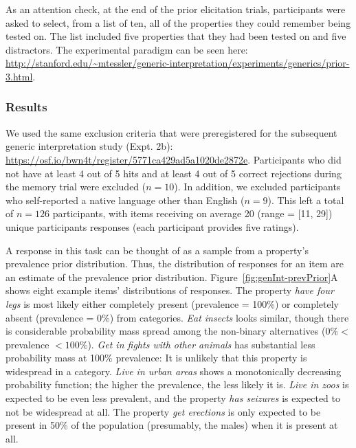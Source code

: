 \documentclass[floatsintext,doc]{apa6}
\theoremstyle{definition}
\theoremstyle{definition}
\theoremstyle{definition}
\theoremstyle{remark}
\begin{document}

As an attention check, at the end of the prior elicitation trials,
participants were asked to select, from a list of ten, all of the
properties they could remember being tested on. The list included five
properties that they had been tested on and five distractors. The
experimental paradigm can be seen here:
\url{http://stanford.edu/~mtessler/generic-interpretation/experiments/generics/prior-3.html}.

\subsubsection{Results}\label{results-1}

We used the same exclusion criteria that were preregistered for the
subsequent generic interpretation study (Expt. 2b):
\url{https://osf.io/bwn4t/register/5771ca429ad5a1020de2872e}.
Participants who did not have at least 4 out of 5 hits and at least 4
out of 5 correct rejections during the memory trial were excluded
(\(n = 10\)). In addition, we excluded participants who self-reported a
native language other than English (\(n = 9\)). This left a total of
\(n = 126\) participants, with items receiving on average 20 (range =
{[}11, 29{]}) unique participants responses (each participant provides
five ratings).

A response in this task can be thought of as a sample from a property's
prevalence prior distribution. Thus, the distribution of responses for
an item are an estimate of the prevalence prior distribution.
Figure~\ref{fig:genInt-prevPrior}A shows eight example items'
distributions of responses. The property \emph{have four legs} is most
likely either completely present (prevalence = 100\%) or completely
absent (prevalence = 0\%) from categories. \emph{Eat insects} looks
similar, though there is considerable probability mass spread among the
non-binary alternatives (\(0\% <\) prevalence \(< 100\%\)). \emph{Get in
fights with other animals} has substantial less probability mass at
100\% prevalence: It is unlikely that this property is widespread in a
category. \emph{Live in urban areas} shows a monotonically decreasing
probability function; the higher the prevalence, the less likely it is.
\emph{Live in zoos} is expected to be even less prevalent, and the
property \emph{has seizures} is expected to not be widespread at all.
The property \emph{get erections} is only expected to be present in 50\%
of the population (presumably, the males) when it is present at all.
\end{document}
